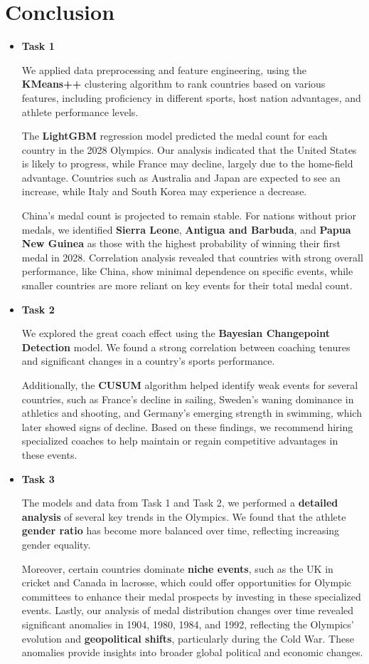 \documentclass[12pt]{article}  %
\begin{document}
\section{Conclusion}
\begin{itemize}
		\item \textbf{Task 1}
		

We applied data preprocessing and feature engineering, using the \textbf{KMeans++} clustering algorithm\cite{3} to rank countries based on various features, including proficiency in different sports, host nation advantages, and athlete performance levels.

The \textbf{LightGBM} regression model predicted the medal count for each country in the 2028 Olympics. Our analysis indicated that the United States is likely to progress, while France may decline, largely due to the home-field advantage. Countries such as Australia and Japan are expected to see an increase, while Italy and South Korea may experience a decrease.

China's medal count is projected to remain stable. For nations without prior medals, we identified \textbf{Sierra Leone}, \textbf{Antigua and Barbuda}, and \textbf{Papua New Guinea} as those with the highest probability of winning their first medal in 2028. Correlation analysis revealed that countries with strong overall performance, like China, show minimal dependence on specific events, while smaller countries are more reliant on key events for their total medal count.
	

	\item \textbf{Task 2}

We explored the great coach effect using the \textbf{Bayesian Changepoint Detection} model. We found a strong correlation between coaching tenures and significant changes in a country’s sports performance.
 
Additionally, the \textbf{CUSUM} algorithm helped identify weak events for several countries, such as France’s decline in sailing, Sweden’s waning dominance in athletics and shooting, and Germany’s emerging strength in swimming, which later showed signs of decline. Based on these findings, we recommend hiring specialized coaches to help maintain or regain competitive advantages in these events.
	\item \textbf{Task 3}
	
The models and data from Task 1 and Task 2, we performed a \textbf{detailed analysis} of several key trends in the Olympics. We found that the athlete \textbf{gender ratio} has become more balanced over time, reflecting increasing gender equality.
 
Moreover, certain countries dominate \textbf{niche events}, such as the UK in cricket and Canada in lacrosse, which could offer opportunities for Olympic committees to enhance their medal prospects by investing in these specialized events. Lastly, our analysis of medal distribution changes over time revealed significant anomalies in 1904, 1980, 1984, and 1992, reflecting the Olympics' evolution and \textbf{geopolitical shifts}, particularly during the Cold War. These anomalies provide insights into broader global political and economic changes.
\end{itemize}
\end{document}

